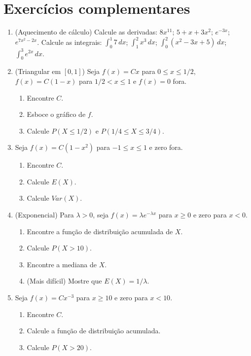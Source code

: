 \documentclass[11pt]{article}
\begin{document}
\bigskip
\section*{Exercícios complementares}

\begin{enumerate}[label=\textbf{C\arabic*.}, leftmargin=*]
\item (Aquecimento de cálculo) Calcule as derivadas: $8x^{11}$; $5 + x + 3x^2$; $e^{-3x}$; $e^{7x^2 - 2x}$. Calcule as integrais: $\int_0^1 7\,dx$; $\int_1^2 x^3\,dx$; $\int_0^2 (x^2 - 3x + 5)\,dx$; $\int_0^3 e^{2x}\,dx$.
\item (Triangular em $[0, 1]$) Seja $f(x) = Cx$ para $0 \leq x \leq 1/2$, $f(x) = C(1 - x)$ para $1/2 < x \leq 1$ e $f(x) = 0$ fora.
\begin{enumerate}[label=(\alph*)]
  \item Encontre $C$.
  \item Esboce o gráfico de $f$.
  \item Calcule $P(X \leq 1/2)$ e $P(1/4 \leq X \leq 3/4)$.
\end{enumerate}
\item Seja $f(x) = C(1 - x^2)$ para $-1 \leq x \leq 1$ e zero fora.
\begin{enumerate}[label=(\alph*)]
  \item Encontre $C$.
  \item Calcule $E(X)$.
  \item Calcule $Var(X)$.
\end{enumerate}
\item (Exponencial) Para $\lambda > 0$, seja $f(x) = \lambda e^{-\lambda x}$ para $x \geq 0$ e zero para $x < 0$.
\begin{enumerate}[label=(\alph*)]
  \item Encontre a função de distribuição acumulada de $X$.
  \item Calcule $P(X > 10)$.
  \item Encontre a mediana de $X$.
  \item (Mais difícil) Mostre que $E(X) = 1/\lambda$.
\end{enumerate}
\item Seja $f(x) = Cx^{-3}$ para $x \geq 10$ e zero para $x < 10$.
\begin{enumerate}[label=(\alph*)]
  \item Encontre $C$.
  \item Calcule a função de distribuição acumulada.
  \item Calcule $P(X > 20)$.
\end{enumerate}

\end{enumerate}
\end{document}
